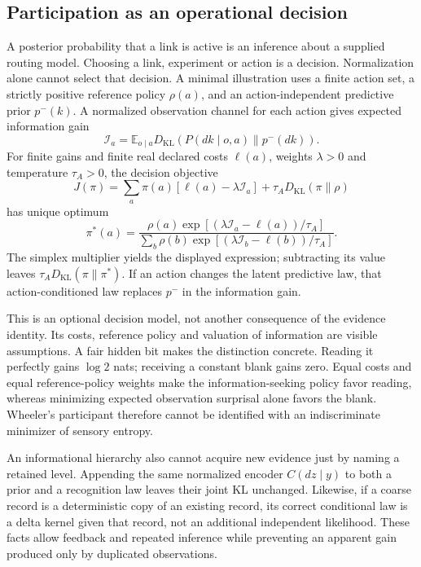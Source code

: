 \subsection{Participation as an operational decision}
A posterior probability that a link is active is an inference about a supplied routing model. Choosing a link, experiment or action is a decision. Normalization alone cannot select that decision. A minimal illustration uses a finite action set, a strictly positive reference policy $\rho(a)$, and an action-independent predictive prior $p^-(k)$. A normalized observation channel for each action gives expected information gain
\begin{equation}
\mathcal I_a=\mathbb E_{o\mid a}
D_{\mathrm{KL}}(P(dk\mid o,a)\|p^-(dk)).
\label{eq:participatory_information_gain}
\end{equation}
For finite gains and finite real declared costs $\ell(a)$, weights $\lambda>0$ and temperature $\tau_A>0$, the decision objective
\begin{equation}
J(\pi)=\sum_a\pi(a)[\ell(a)-\lambda\mathcal I_a]
+\tau_AD_{\mathrm{KL}}(\pi\|\rho)
\label{eq:participatory_policy_objective}
\end{equation}
has unique optimum
\begin{equation}
\pi^*(a)=
\frac{\rho(a)\exp[(\lambda\mathcal I_a-\ell(a))/\tau_A]}
{\sum_b\rho(b)\exp[(\lambda\mathcal I_b-\ell(b))/\tau_A]}.
\label{eq:participatory_policy}
\end{equation}
The simplex multiplier yields the displayed expression; subtracting its value leaves $\tau_AD_{\mathrm{KL}}(\pi\|\pi^*)$. If an action changes the latent predictive law, that action-conditioned law replaces $p^-$ in the information gain.

This is an optional decision model, not another consequence of the evidence identity. Its costs, reference policy and valuation of information are visible assumptions. A fair hidden bit makes the distinction concrete. Reading it perfectly gains $\log2$ nats; receiving a constant blank gains zero. Equal costs and equal reference-policy weights make the information-seeking policy favor reading, whereas minimizing expected observation surprisal alone favors the blank. Wheeler's participant therefore cannot be identified with an indiscriminate minimizer of sensory entropy.

An informational hierarchy also cannot acquire new evidence just by naming a retained level. Appending the same normalized encoder $C(dz\mid y)$ to both a prior and a recognition law leaves their joint KL unchanged. Likewise, if a coarse record is a deterministic copy of an existing record, its correct conditional law is a delta kernel given that record, not an additional independent likelihood. These facts allow feedback and repeated inference while preventing an apparent gain produced only by duplicated observations.
